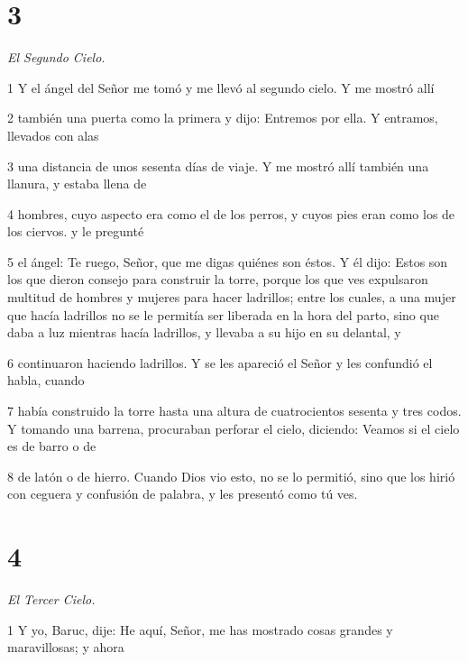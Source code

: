 \chapter{3}

\par \textit{El Segundo Cielo.}

\par 1 Y el ángel del Señor me tomó y me llevó al segundo cielo. Y me mostró allí

\par 2 también una puerta como la primera y dijo: Entremos por ella. Y entramos, llevados con alas

\par 3 una distancia de unos sesenta días de viaje. Y me mostró allí también una llanura, y estaba llena de

\par 4 hombres, cuyo aspecto era como el de los perros, y cuyos pies eran como los de los ciervos. y le pregunté

\par 5 el ángel: Te ruego, Señor, que me digas quiénes son éstos. Y él dijo: Estos son los que dieron consejo para construir la torre, porque los que ves expulsaron multitud de hombres y mujeres para hacer ladrillos; entre los cuales, a una mujer que hacía ladrillos no se le permitía ser liberada en la hora del parto, sino que daba a luz mientras hacía ladrillos, y llevaba a su hijo en su delantal, y

\par 6 continuaron haciendo ladrillos. Y se les apareció el Señor y les confundió el habla, cuando

\par 7 había construido la torre hasta una altura de cuatrocientos sesenta y tres codos. Y tomando una barrena, procuraban perforar el cielo, diciendo: Veamos si el cielo es de barro o de

\par 8 de latón o de hierro. Cuando Dios vio esto, no se lo permitió, sino que los hirió con ceguera y confusión de palabra, y les presentó como tú ves.

\chapter{4}

\par \textit{El Tercer Cielo.}

\par 1 Y yo, Baruc, dije: He aquí, Señor, me has mostrado cosas grandes y maravillosas; y ahora

